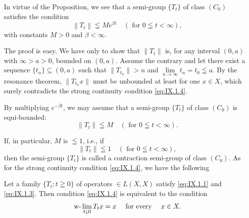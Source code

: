 In virtue of the Proposition, we see that a semi-group $\{T_t\}$ of class $(C_0)$ satisfies the condition 
\begin{equation}\label{eq:IX.1.5}
\left\| T _{t} \right\| \leqq M e ^{\beta t} \quad (\text{ for } 0 \leqq t < \infty),
\end{equation}
with constants $M > 0$ and $\beta < \infty$. 

The proof is easy. We have only to show that $\|T_t\|$ is, for any interval $(0, a)$ with $\infty > a > 0$, bounded on $(0, a)$. Assume the contrary and let there exist a sequence $\{t_n\} \subseteq (0, a)$ such that $\|T_{t_{n}}\| > n$ and $\lim\limits_{n \to \infty} t_n = t_0 \leqq a$. By the resonance theorem, $\|T_{t_{n}}x\|$ must be unbounded at least for one $x \in X$, which surely contradicts the strong continuity condition \eqref{eq:IX.1.4}. 

\begin{remarku} By multiplying $e^{-\beta t}$, we may assume that a semi-group $\{T_{t}\}$ of class $(C_{0})$ is equi-bounded: 
\begin{equation}\label{eq:IX.1.6}
\left\| T _{t} \right\| \leqq M \quad (\text{ for } 0 \leqq t < \infty).
\end{equation}
\end{remarku}

If, in particular, $M$ is $\leqq 1$, i.e., if 
\begin{equation}\label{eq:IX.1.7}
\left\| T _{t} \right\| \leqq 1 \quad (\text{ for } 0 \leqq t < \infty),
\end{equation}
then the semi-group $\{T_t\}$ is called a contraction semi-group of class $(C_0)$. As for the strong continuity condition \eqref{eq:IX.1.4}, we have the following 

\begin{theoremu} Let a family $\{T_t; t \geqq 0\}$ of operators $\in L(X, X)$ satisfy \eqref{eq:IX.1.1} and \eqref{eq:IX.1.3}. Then condition \eqref{eq:IX.1.4} is equivalent to the condition 
\begin{equation}\label{eq:IX.1.8}
\text{w-}\lim _{t \downarrow 0} T _{t} x = x \quad \text{ for every } \quad x \in X.
\end{equation}
\end{theoremu}


